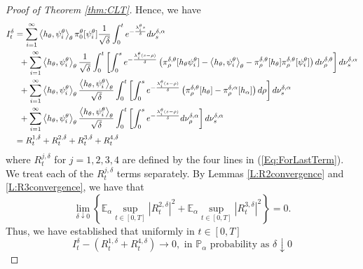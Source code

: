\documentclass{article}
\begin{document}
\begin{proof} [Proof of Theorem \ref{thm:CLT}]
Hence, we have
\begin{align}
I^{\delta}_{t}&=
\sum_{i=1}^{\infty}\left<h_{\theta},\psi_i^{\theta}\right>_{\theta}\pi_0^{\theta}[\psi_i^{\theta}] \frac{1}{\sqrt\delta}\int_{0}^{t}e^{-\frac{\lambda_i^{\theta} s}{\delta}}d\nu_s^{\delta,\alpha}\nonumber\\
&\hspace{0.2cm}+ \sum_{i=1}^{\infty}\left<h_{\theta},\psi_i^{\theta}\right>_{\theta}  \frac{1}{\sqrt\delta}\int_{0}^{t}\left[\int_0^s e^{-\frac{\lambda_i^{\theta}(s-\rho)}{\delta}}\left(\pi_\rho^{\delta,\theta}[h_{\theta}\psi_i^{\theta}]-\left<h_{\theta},\psi_i^{\theta}\right>_{\theta}
-\pi_\rho^{\delta,\theta}[h_{\theta}]\pi_\rho^{\delta,\theta}[\psi_i^{\theta}]
\right)d\nu_\rho^{\delta,\theta}\right]d\nu_s^{\delta,\alpha}\nonumber\\
&\hspace{0.2cm}+\sum_{i=1}^{\infty}\left<h_{\theta},\psi_i^{\theta}\right>_{\theta}\frac{\left<h_{\theta},\psi_i^{\theta}\right>_{\theta}}{\sqrt\delta}\int_{0}^{t}\left[\int_0^s e^{-\frac{\lambda_i^{\theta}(s-\rho)}{\delta}}\left(\pi_\rho^{\delta,\theta}[h_{\theta}]-\pi_\rho^{\delta,\alpha}[h_{\alpha}]\right)d\rho\right]d\nu_s^{\delta,\alpha}\nonumber\\
&\hspace{0.2cm}+\sum_{i=1}^{\infty}\left<h_{\theta},\psi_i^{\theta}\right>_{\theta}\frac{\left<h_{\theta},\psi_i^{\theta}\right>_{\theta}}{\sqrt\delta}\int_0^t \left[\int_0^s e^{-\frac{\lambda_i^{\theta}(s-\rho)}{\delta}}d\nu_\rho^{\delta,\alpha}\right]d\nu_s^{\delta,\alpha} \nonumber\\
&=R^{1,\delta}_{t}+R^{2,\delta}_{t}+R^{3,\delta}_{t}+R^{4,\delta}_{t}\label{Eq:ForLastTerm}
\end{align}
where $R^{j,\delta}_{t}$ for $j=1,2,3,4$ are defined by the four lines in (\ref{Eq:ForLastTerm}). We treat each of the $R^{j,\delta}_{t}$ terms separately. By Lemmas \ref{L:R2convergence} and \ref{L:R3convergence}, we have that
\begin{equation*}
\lim_{\delta\downarrow 0}\left\{\mathbb{E}_{\alpha}\sup_{t\in[0,T]}\left|R^{2,\delta}_{t}\right|^{2}+\mathbb{E}_{\alpha}\sup_{t\in[0,T]}\left|R^{3,\delta}_{t}\right|^{2}\right\}=0.
\end{equation*}
Thus, we have established that uniformly in $t\in[0,T]$
\begin{equation}
I^{\delta}_{t}-(R^{1,\delta}_{t}+R^{4,\delta}_{t})\rightarrow 0, \text{ in } \mathbb{P}_{\alpha}\text{ probability as }\delta\downarrow 0\label{Eq:EquivalentWeakLimit}
\end{equation}


\end{proof}
\end{document}

